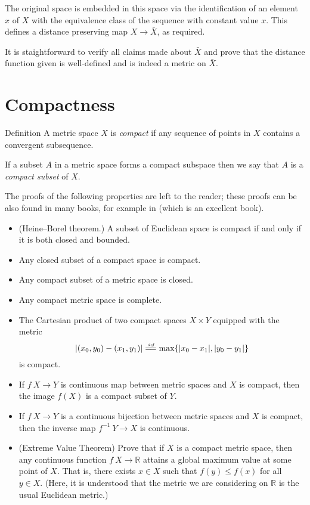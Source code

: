 The original space is embedded in this space via the identification of an element $x$ of $X$ with the equivalence class of the sequence with constant value $x$.  
This defines a distance preserving map $X\to \bar X$, as required. 

It is staightforward to verify all claims made about $\bar X$ and prove that the distance function given is well-defined and is indeed a metric on $\bar X$.


\section{Compactness}

\begin{thm}{Definition}
A metric space $X$ is \emph{compact} if any sequence of points in $X$ contains a convergent subsequence.

If a subset $A$ in a metric space forms a compact subspace then we say that $A$ is a \emph{compact subset} of $X$.
\end{thm}


The proofs of the following properties are left to the reader;
these proofs can be also found in many books,
for example in \cite{rudin}
(which is an excellent book).

\begin{itemize}
\item (Heine--Borel theorem.) A subset of Euclidean space is compact if and only if it is both closed and bounded.
\item Any closed subset of a compact space is compact.
\item\label{compact=>closed} Any compact subset of a metric space is closed.
\item Any compact metric space is complete.
\item The Cartesian product of two compact spaces $X\times Y$ equipped with the metric 
$$|(x_0,y_0)-(x_1,y_1)|\df \max\{|x_0-x_1|,|y_0-y_1|\}$$
is compact.
\item \label{ex:compact-image}
If $f\: X \to Y$ is continuous map between metric spaces and $X$ is compact, then the image $f(X)$ is a compact subset of $Y$.
\item\label{ex:compact-homeo}
If $f\: X \to Y$ is a continuous bijection between metric spaces and $X$ is compact, then the inverse map $f^{-1}\: Y \to X$ is continuous.
\item\label{ex:EVT}
(Extreme Value Theorem) Prove that if $X$ is a compact metric space, then any continuous function $f\: X \to \mathbb{R}$ attains a global maximum value at some point of $X$.  That is, there exists $x \in X$ such that $f(y) \leq f(x)$ for all $y \in X$.
(Here, it is understood that the metric we are considering on $\mathbb{R}$ is the usual Euclidean metric.)
\end{itemize}

